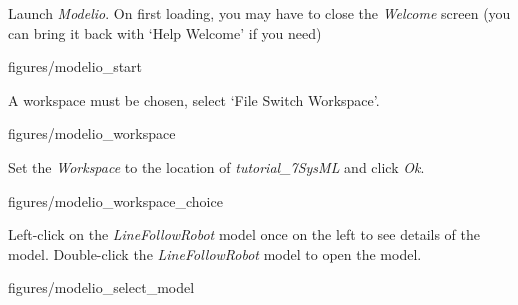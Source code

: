 \documentclass[11pt,a4paper]{../tutorial}
\begin{document}
\begin{instructions}

\item Launch \emph{Modelio}. On first loading, you may have to close the \emph{Welcome} screen (you can bring it back with `Help \menusep Welcome' if you need)

\begin{center}
\begin{annotation}[width=1\linewidth,trim=0 400 0 0,clip]{figures/modelio_start}
    \end{annotation}
\end{center}

\item A workspace must be chosen, select `File \menusep Switch Workspace’.

\begin{center}
\begin{annotation}[width=1\linewidth,trim=0 700 0 0,clip]{figures/modelio_workspace}
    \end{annotation}
\end{center}


\newpage

\item Set the \emph{Workspace} to the location of \emph{tutorial\_7\pathsep{}SysML} and click \emph{Ok}.

\begin{center}
\begin{annotation}[width=0.5\linewidth,trim=0 0 0 0,clip]{figures/modelio_workspace_choice}
    \end{annotation}
\end{center}


\item Left-click on the \emph{LineFollowRobot} model once on the left to see details of the model. Double-click the \emph{LineFollowRobot} model to open the model.

\begin{center}
\begin{annotation}[width=1\linewidth,trim=0 300 0 0,clip]{figures/modelio_select_model}
    \end{annotation}
\end{center}

\end{instructions}
\end{document}
